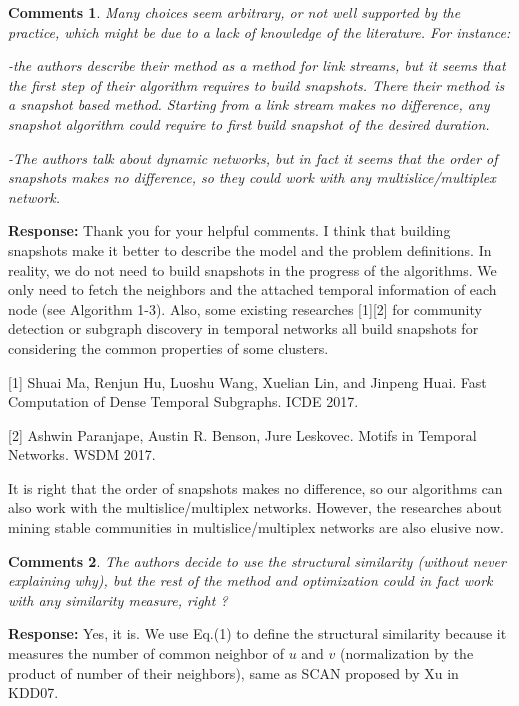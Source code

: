 \documentclass{article}
\newtheorem{Comments}{\textbf{Comments}}
\begin{document}
\begin{Comments}
Many choices seem arbitrary, or not well supported by the practice, which might be due to a lack of knowledge of the literature. For instance:

-the authors describe their method as a method for link streams, but it seems that the first step of their algorithm requires to build snapshots. There their method is a snapshot based method. Starting from a link stream makes no difference, any snapshot algorithm could require to first build snapshot of the desired duration.

-The authors talk about dynamic networks, but in fact it seems that the order of snapshots makes no difference, so they could work with any multislice/multiplex network.

\end{Comments}
\noindent \textbf{Response: } Thank you for your helpful comments. I think that building snapshots make it better to describe the model and the problem definitions. In reality, we do not need to build snapshots in the progress of the algorithms. We only need to fetch the neighbors and the attached temporal information of each node (see Algorithm 1-3). Also, some existing researches [1][2] for community detection or subgraph discovery in temporal networks all build snapshots for considering the common properties of some clusters.

[1] Shuai Ma, Renjun Hu, Luoshu Wang, Xuelian Lin, and Jinpeng Huai. Fast Computation of Dense Temporal Subgraphs. ICDE 2017. 

[2] Ashwin Paranjape, Austin R. Benson, Jure Leskovec. Motifs in Temporal Networks. WSDM 2017.


It is right that the order of snapshots makes no difference, so our algorithms can also work with the multislice/multiplex networks. However, the researches about mining stable communities in multislice/multiplex networks are also elusive now. %






\begin{Comments}
	The authors decide to use the structural similarity (without never explaining why), but the rest of the method and optimization could in fact work with any similarity measure, right ?
\end{Comments}
\noindent \textbf{Response: } Yes, it is. We use Eq.(1) to define the structural similarity because it measures the number of common neighbor of $u$ and $v$ (normalization by the product of number of their neighbors), same as SCAN proposed by Xu in KDD07.
\end{document}

